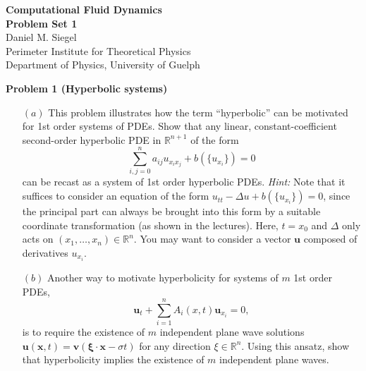 \documentclass[letter,11pt]{article}
\newcommand{\Rn}{\mathbb{R}^n}
\newcommand{\RR}{\mathbb{R}}
\begin{document}
\pagestyle{problem_set}


\phantom{.}
\begin{center}
{\Large\textbf{Computational Fluid Dynamics\\[0.4cm] Problem Set 1}} \\[0.7cm]
Daniel M. Siegel \\[0.1cm]
Perimeter Institute for Theoretical Physics\\
Department of Physics, University of Guelph
\end{center}

\vspace{1cm}

{\noindent\large\textbf{Problem 1 (Hyperbolic systems)}}%

\begin{itemize}
  \item[$(a)$] This problem illustrates how the term ``hyperbolic'' can be motivated for 1st order systems of PDEs. Show that any linear, constant-coefficient second-order hyperbolic PDE in $\RR^{n+1}$ of the form
  \begin{equation}
    \sum_{i,j = 0}^{n} a_{ij} u_{x_i x_j} + b(\{u_{x_i}\}) = 0
  \end{equation}
   can be recast as a system of 1st order hyperbolic PDEs. \newline
   \emph{Hint:} Note that it suffices to consider an equation of the form $u_{tt}-\Delta u + b(\{u_{x_i}\}) = 0$, since the principal part can always be brought into this form by a suitable coordinate transformation (as shown in the lectures). Here, $t=x_0$ and $\Delta$ only acts on $(x_1,\ldots,x_n)\in\Rn$. You may want to consider a vector $\mathbf{u}$ composed of derivatives $u_{x_i}$.

   \item[$(b)$] Another way to motivate hyperbolicity for systems of $m$ 1st order PDEs,
    \begin{equation}
    \mathbf{u}_t + \sum_{i=1}^{n} A_{i}(x,t) \mathbf{u}_{x_i} = 0,
    \end{equation}
    is to  require the existence of $m$ independent plane wave solutions $\mathbf{u}(\mathbf{x},t) = \mathbf{v}(\mathbf{\xi\cdot x} - \sigma t)$ for any direction $\xi\in\Rn$. Using this ansatz, show that hyperbolicity implies the existence of $m$ independent plane waves.
\end{itemize}

\vspace{1cm}
\end{document}

